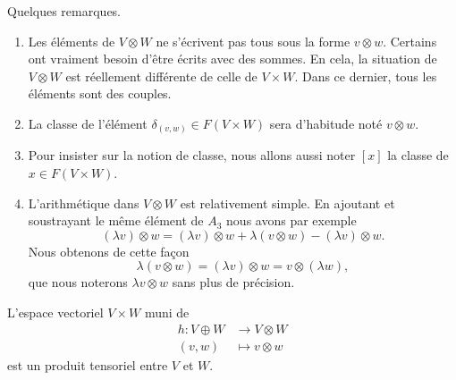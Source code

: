 \begin{remark}      \label{REMooSLEGooWEiutz}
	Quelques remarques.
	\begin{enumerate}
		\item
		      Les éléments de \( V\otimes W\) ne s'écrivent pas tous sous la forme \( v\otimes w\). Certains ont vraiment besoin d'être écrits avec des sommes. En cela, la situation de \( V\otimes W\) est réellement différente de celle de \( V\times W\). Dans ce dernier, tous les éléments sont des couples.
		\item
		      La classe de l'élément \( \delta_{(v,w)}\in F(V\times W)\) sera d'habitude noté \( v\otimes w\).
		\item
		      Pour insister sur la notion de classe, nous allons aussi noter \( [x]\) la classe de \( x\in F(V\times W)\).
		\item       \label{ITEMooPVWHooMkgQoT}
		      L'arithmétique dans \( V\otimes W\) est relativement simple. En ajoutant et soustrayant le même élément de \( A_3\) nous avons par exemple
		      \begin{equation}
			      (\lambda v)\otimes w=(\lambda v)\otimes w+\lambda (v\otimes w)-(\lambda v)\otimes w.
		      \end{equation}
		      Nous obtenons de cette façon
		      \begin{equation}
			      \lambda(v\otimes w)=(\lambda v)\otimes w=v\otimes (\lambda w),
		      \end{equation}
		      que nous noterons \( \lambda v\otimes w\) sans plus de précision.
	\end{enumerate}
\end{remark}

\begin{proposition}     \label{PROPooIWZDooRRZNCf}
	L'espace vectoriel \( V\times W\) muni de
	\begin{equation}
		\begin{aligned}
			h\colon V\oplus W & \to V\otimes W     \\
			(v,w)             & \mapsto v\otimes w
		\end{aligned}
	\end{equation}
	est un produit tensoriel entre \( V\) et \( W\).
\end{proposition}

